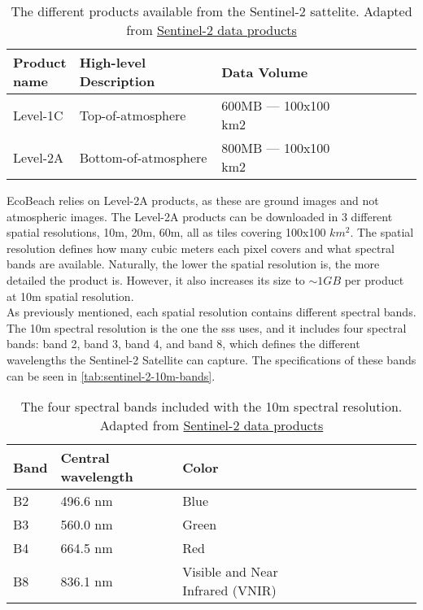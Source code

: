 \begin{table}[h!]
    \centering
    \begin{tabular}{| p{0.15\linewidth} | p{0.35\linewidth} | p{0.35\linewidth} |p{0.15\linewidth} |}
        \hline
        \textbf{Product name} & \textbf{High-level Description} & \textbf{Data Volume} \\ \hline
        Level-1C              & Top-of-atmosphere               & 600MB — 100x100 km2  \\\hline
        Level-2A              & Bottom-of-atmosphere            & 800MB — 100x100 km2  \\\hline
    \end{tabular}
    \caption{The different products available from the Sentinel-2 sattelite. Adapted from \href{https://sentinels.copernicus.eu/web/sentinel/missions/sentinel-2/data-products}{Sentinel-2 data products}}
    \label{tab:sentinel-2-product-types}
\end{table}

EcoBeach relies on Level-2A products, as these are ground images and not atmospheric images. The Level-2A products can be downloaded in 3 different spatial resolutions, 10m, 20m, 60m, all as tiles covering 100x100 $km^2$. The spatial resolution defines how many cubic meters each pixel covers and what spectral bands are available. Naturally, the lower the spatial resolution is, the more detailed the product is. However, it also increases its size to $\sim 1GB$ per product at 10m spatial resolution. \\

As previously mentioned, each spatial resolution contains different spectral bands. The 10m spectral resolution is the one the \acrshort{sss} uses, and it includes four spectral bands: band 2, band 3, band 4, and band 8, which defines the different wavelengths the Sentinel-2 Satellite can capture. The specifications of these bands can be seen in \autoref{tab:sentinel-2-10m-bands}.
\cite{sentinel-2-product-specification}

\begin{table}[h!]
    \centering
    \begin{tabular}{| p{0.1\linewidth} | p{0.3\linewidth} | p{0.3\linewidth} | p{0.3\linewidth} |}
        \hline
        \textbf{Band} & \textbf{Central wavelength} & \textbf{Color}                   \\ \hline
        B2            & 496.6 nm                    & Blue                             \\ \hline
        B3            & 560.0 nm                    & Green                            \\ \hline
        B4            & 664.5 nm                    & Red                              \\ \hline
        B8            & 836.1 nm                    & Visible and Near Infrared (VNIR) \\ \hline
    \end{tabular}
    \caption{The four spectral bands included with the 10m spectral resolution. Adapted from \href{https://sentinels.copernicus.eu/web/sentinel/missions/sentinel-2/data-products}{Sentinel-2 data products}}
    \label{tab:sentinel-2-10m-bands}
\end{table}

